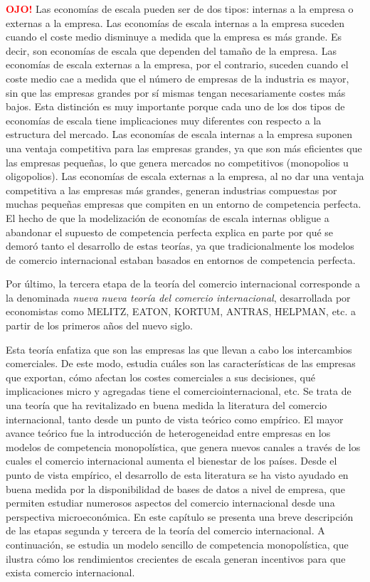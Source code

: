 \documentclass[10pt,a4paper]{article}
\begin{document}
\textcolor{red}{\textbf{OJO!}} Las economías de escala pueden ser de dos tipos: internas a la empresa o externas a la empresa. Las economías de escala internas a la empresa suceden cuando el coste medio disminuye a medida que la empresa es más grande. Es decir, son economías de escala que dependen del tamaño de la empresa. Las economías de escala externas a la empresa, por el contrario, suceden cuando el coste medio cae a medida que el número de empresas de la industria es mayor, sin que las empresas grandes por sí mismas tengan necesariamente costes más bajos. Esta distinción es muy importante porque cada uno de los dos tipos de economías de escala tiene implicaciones muy diferentes con respecto a la estructura del mercado. Las economías de escala internas a la empresa suponen una ventaja competitiva para las empresas grandes, ya que son más eficientes que las empresas pequeñas, lo que genera mercados no competitivos (monopolios u oligopolios). Las economías de escala externas a la empresa, al no dar una ventaja competitiva a las empresas más grandes, generan industrias compuestas por muchas pequeñas empresas que compiten en un entorno de competencia perfecta. El hecho de que la modelización de economías de escala internas obligue a abandonar el supuesto de competencia perfecta explica en parte por qué se demoró tanto el desarrollo de estas teorías, ya que tradicionalmente los modelos de comercio internacional estaban basados en entornos de competencia perfecta.


Por último, la tercera etapa de la teoría del comercio internacional corresponde a la denominada \textit{nueva nueva teoría del comercio internacional}, desarrollada por economistas como MELITZ, EATON, KORTUM, ANTRAS, HELPMAN, etc. a partir de los primeros años del nuevo siglo. 

Esta teoría enfatiza que son las empresas las que llevan a cabo los intercambios comerciales. De este modo, estudia cuáles son las características de las empresas que exportan, cómo afectan los costes comerciales a sus decisiones, qué implicaciones micro y agregadas tiene el comerciointernacional, etc. Se trata de una teoría que ha revitalizado en buena medida la literatura del comercio internacional, tanto desde un punto de vista teórico como empírico. El mayor avance teórico fue la introducción de heterogeneidad entre empresas en los modelos de competencia monopolística, que genera nuevos canales a través de los cuales el comercio internacional aumenta el bienestar de los países. Desde el punto de vista empírico, el desarrollo de esta literatura se ha visto ayudado en buena medida por la disponibilidad de bases de datos a nivel de empresa, que permiten estudiar numerosos aspectos del comercio internacional desde una perspectiva microeconómica. En este capítulo se presenta una breve descripción de las etapas segunda y tercera de la teoría del comercio internacional. A continuación, se estudia un modelo sencillo de competencia monopolística, que ilustra cómo los rendimientos crecientes de escala generan incentivos para que exista comercio internacional.
\end{document}
